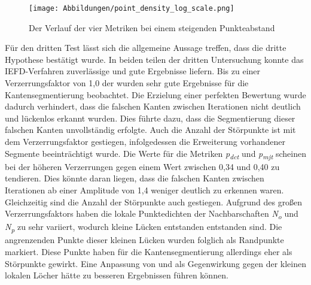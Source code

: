 \begin{figure}[t]
	\texttt{[image: Abbildungen/point\_density\_log\_scale.png]}
	\centering
	\caption[Verhältnis zwischen Genauigkeit und Punkteabstand]{Der Verlauf der vier Metriken bei einem steigenden Punkteabstand}
	\label{fig: point_density_trend}
\end{figure}

Für den dritten Test lässt sich die allgemeine Aussage treffen, dass die dritte Hypothese bestätigt wurde. In beiden teilen der dritten Untersuchung konnte das IEFD-Verfahren zuverlässige und gute Ergebnisse liefern. Bis zu einer Verzerrungsfaktor von 1,0 der wurden sehr gute Ergebnisse für die Kantensegmentierung beobachtet. Die Erzielung einer perfekten Bewertung wurde dadurch verhindert, dass die falschen Kanten zwischen Iterationen nicht deutlich und lückenlos erkannt wurden. Dies führte dazu, dass die Segmentierung dieser falschen Kanten unvollständig erfolgte. Auch die Anzahl der Störpunkte ist mit dem Verzerrungsfaktor gestiegen, infolgedessen die Erweiterung vorhandener Segmente beeinträchtigt wurde. Die Werte für die Metriken \textit{p\textsubscript{dct}} und \textit{p\textsubscript{mjt}} scheinen bei der höheren Verzerrungen gegen einem Wert zwischen 0,34 und 0,40 zu tendieren. Dies könnte daran liegen, dass die falschen Kanten zwischen Iterationen ab einer Amplitude von 1,4 weniger deutlich zu erkennen waren. Gleichzeitig sind die Anzahl der Störpunkte auch gestiegen. Aufgrund des großen Verzerrungsfaktors haben die lokale Punktedichten der Nachbarschaften \textit{N\textsubscript{o}} und \textit{N\textsubscript{p}} zu sehr variiert, wodurch kleine Lücken entstanden entstanden sind. Die angrenzenden Punkte dieser kleinen Lücken wurden folglich als Randpunkte markiert. Diese Punkte haben für die Kantensegmentierung allerdings eher als Störpunkte gewirkt. Eine Anpassung von \distthresha und \distthreshb als Gegenwirkung gegen der kleinen lokalen Löcher hätte zu besseren Ergebnissen führen können. 

